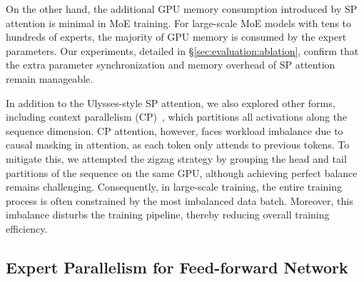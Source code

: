 
On the other hand, the additional GPU memory consumption introduced by SP attention is minimal in MoE training. For large-scale MoE models with tens to hundreds of experts, the majority of GPU memory is consumed by the expert parameters. Our experiments, detailed in \S\ref{sec:evaluation:ablation}, confirm that the extra parameter synchronization and memory overhead of SP attention remain manageable.

 In addition to the Ulysses-style SP attention, we also explored other forms, including context parallelism (CP)~\cite{context_parallelism}, which partitions all activations along the sequence dimension. CP attention, however, faces workload imbalance due to causal masking in attention, as each token only attends to previous tokens. To mitigate this, we attempted the zigzag strategy by grouping the head and tail partitions of the sequence on the same GPU, although achieving perfect balance remains challenging. Consequently, in large-scale training, the entire training process is often constrained by the most imbalanced data batch. Moreover, this imbalance disturbs the training pipeline, thereby reducing overall training efficiency.

\subsection{Expert Parallelism for Feed-forward Network}
\label{sec:design:parallelism:ep}


